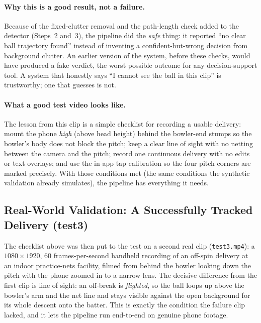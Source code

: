 \documentclass[12pt,a4paper]{report}
\begin{document}
\paragraph{Why this is a good result, not a failure.}
Because of the fixed-clutter removal and the path-length check added to the detector (Steps~2 and~3), the pipeline did the \emph{safe} thing: it reported ``no clear ball trajectory found'' instead of inventing a confident-but-wrong decision from background clutter. An earlier version of the system, before these checks, would have produced a fake verdict, the worst possible outcome for any decision-support tool. A system that honestly says ``I cannot see the ball in this clip'' is trustworthy; one that guesses is not.

\paragraph{What a good test video looks like.}
The lesson from this clip is a simple checklist for recording a usable delivery: mount the phone \emph{high} (above head height) behind the bowler-end stumps so the bowler's body does not block the pitch; keep a clear line of sight with no netting between the camera and the pitch; record one continuous delivery with no edits or text overlays; and use the in-app tap calibration so the four pitch corners are marked precisely. With those conditions met (the same conditions the synthetic validation already simulates), the pipeline has everything it needs.

\subsection{Real-World Validation: A Successfully Tracked Delivery (test3)}
\label{sec:realval_success}

The checklist above was then put to the test on a second real clip (\texttt{test3.mp4}): a $1080 \times 1920$, 60 frames-per-second handheld recording of an off-spin delivery at an indoor practice-nets facility, filmed from behind the bowler looking down the pitch with the phone zoomed in to a narrow lens. The decisive difference from the first clip is line of sight: an off-break is \emph{flighted}, so the ball loops up above the bowler's arm and the net line and stays visible against the open background for its whole descent onto the batter. This is exactly the condition the failure clip lacked, and it lets the pipeline run end-to-end on genuine phone footage.
\end{document}
